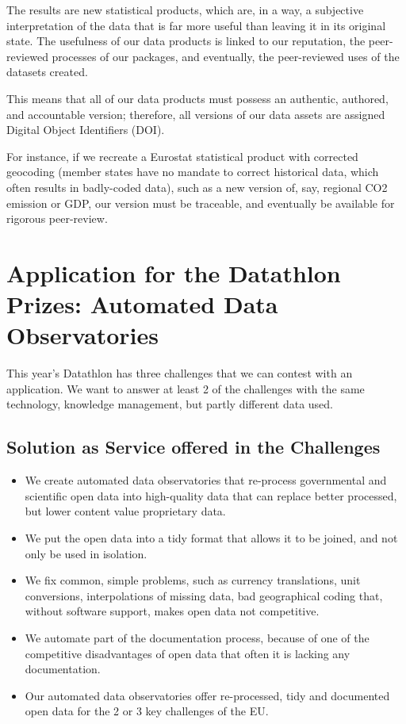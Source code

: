 \documentclass[
  a4paper,
  openany, a4paper, oneside]{book}
\begin{document}
The results are new statistical products, which are, in a way, a subjective interpretation of the data that is far more useful than leaving it in its original state. The usefulness of our data products is linked to our reputation, the peer-reviewed processes of our packages, and eventually, the peer-reviewed uses of the datasets created.

This means that all of our data products must possess an authentic, authored, and accountable version; therefore, all versions of our data assets are assigned Digital Object Identifiers (DOI).

For instance, if we recreate a Eurostat statistical product with corrected geocoding (member states have no mandate to correct historical data, which often results in badly-coded data), such as a new version of, say, regional CO2 emission or GDP, our version must be traceable, and eventually be available for rigorous peer-review.

\hypertarget{intro}{%
\chapter{Application for the Datathlon Prizes: Automated Data Observatories}\label{intro}}

This year's Datathlon has three challenges that we can contest with an application. We want to answer at least 2 of the challenges with the same technology, knowledge management, but partly different data used.

\hypertarget{solution-as-service-offered-in-the-challenges}{%
\section{Solution as Service offered in the Challenges}\label{solution-as-service-offered-in-the-challenges}}

\begin{itemize}
\item
  We create automated data observatories that re-process governmental and scientific open data into high-quality data that can replace better processed, but lower content value proprietary data.
\item
  We put the open data into a tidy format that allows it to be joined, and not only be used in isolation.
\item
  We fix common, simple problems, such as currency translations, unit conversions, interpolations of missing data, bad geographical coding that, without software support, makes open data not competitive.
\item
  We automate part of the documentation process, because of one of the competitive disadvantages of open data that often it is lacking any documentation.
\item
  Our automated data observatories offer re-processed, tidy and documented open data for the 2 or 3 key challenges of the EU.
\end{itemize}
\end{document}
